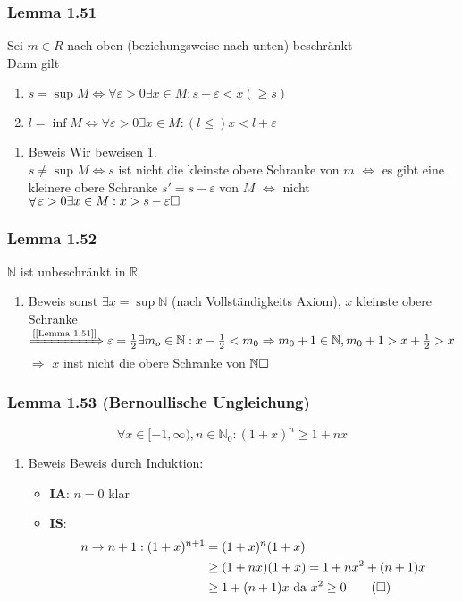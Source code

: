 \documentclass[11pt]{article}
\DeclareMathOperator{\Forall}{\forall}%
\begin{document}
\subsubsection{Lemma 1.51}
\label{sec-2-9-18}
Sei $m\in R$ nach oben (beziehungsweise nach unten) beschränkt \\
    Dann gilt
\begin{enumerate}
\item $s = \sup M \Leftrightarrow \Forall \varepsilon > 0 \exists x\in M: s - \varepsilon < x (\geq s)$
\item $l=\inf M \Leftrightarrow \Forall \varepsilon > 0 \exists x\in M: (l \leq) x < l + \varepsilon$
\end{enumerate}
\begin{enumerate}
\item Beweis
\label{sec-2-9-18-1}
Wir beweisen 1. \\
     $s\neq \sup M\Leftrightarrow s$ ist nicht die kleinste obere Schranke von $m$ $\Leftrightarrow$ es gibt eine kleinere obere Schranke $s' = s - \varepsilon$ von $M$ $\Leftrightarrow$
nicht $\Forall \varepsilon > 0\exists x\in M: x > s - \varepsilon \hfill \square$
\end{enumerate}
\subsubsection{Lemma 1.52}
\label{sec-2-9-19}
$\mathbb{N}$ ist unbeschränkt in $\mathbb{R}$
\begin{enumerate}
\item Beweis
\label{sec-2-9-19-1}
sonst $\exists x = \sup \mathbb{N}$ (nach Vollständigkeits Axiom), $x$ kleinste obere Schranke $\xRightarrow{\text{[[Lemma 1.51]]}} \varepsilon= \frac{1}{2} \exists m_o \in \mathbb{N}:x - \frac{1}{2} < m_0 \Rightarrow m_0 + 1 \in \mathbb{N},m_0 + 1 > x + \frac{1}{2} > x$
$\Rightarrow$ $x$ inst nicht die obere Schranke von $\mathbb{N}\hfill\square$
\end{enumerate}
\subsubsection{Lemma 1.53 (Bernoullische Ungleichung)}
\label{sec-2-9-20}
\label{Lemma-1.53}
\[\Forall x\in [-1,\infty),n\in\mathbb{N}_0: (1 + x)^n \geq 1 + n x\]
\begin{enumerate}
\item Beweis
\label{sec-2-9-20-1}
Beweis durch Induktion:
\begin{itemize}
\item \textbf{IA}: $n = 0$ klar
\item \textbf{IS}:
\begin{align}
n\to n + 1: (1 + x)^{n + 1} &= (1 + x)^n(1 + x) \\
&\geq (1 + n x) (1 + x) = 1 + nx^2 + (n + 1) x \\
&\geq 1 + (n + 1) x~\text{da $x^2 \geq 0$} \tag{\text{$\square$}}
\end{align}
\end{itemize}
\end{enumerate}
\end{document}
